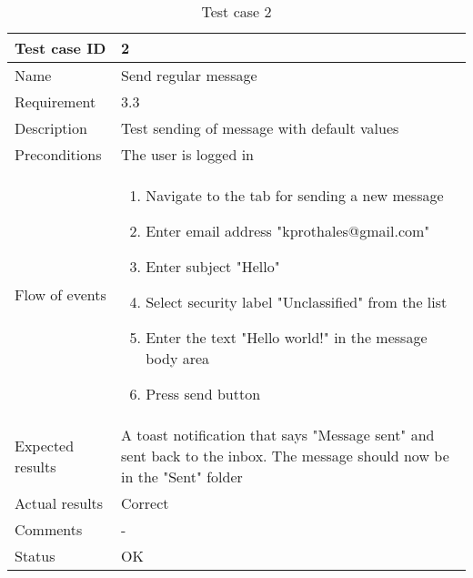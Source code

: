 		\begin{table}[htb]
			\begin{tabular}{l|p{10cm}}
				Test case ID & 2 \\ \hline
				Name & Send regular message\\ \hline
				Requirement & 3.3\\ \hline
				Description & Test sending of message with default values\\ \hline
				Preconditions & The user is logged in\\ \hline
				Flow of events & 
					\begin{enumerate}
						\item{}Navigate to the tab for sending a new message
						\item{}Enter email address "kprothales@gmail.com"
						\item{}Enter subject "Hello"
						\item{}Select security label "Unclassified" from the list
						\item{}Enter the text "Hello world!" in the message body area
						\item{}Press send button
					\end{enumerate} \\ \hline
				Expected results & A toast notification that says "Message sent" and sent back to the inbox. The message 						should now be in the "Sent" folder\\ \hline
				Actual results & Correct\\ \hline
				Comments & -\\ \hline
				Status & OK\\ \hline
			\end{tabular}
			\caption{Test case 2} \label{tab:case2}
		\end{table}

